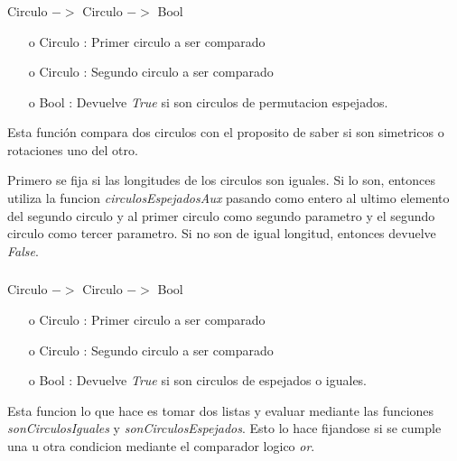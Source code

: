 \documentclass[10pt,journal]{IEEEtran}
\begin{document}
\subsubsection{\color{Red}{sonCirculosEspejados}}
\begin{description}[style=nextline]
        \item[\color{Green}{Signatura}] Circulo $->$ Circulo $->$ Bool
        \begin{itemize} 
        \item [o] Circulo : Primer circulo a ser comparado  
        \item [o] Circulo : Segundo circulo a ser comparado
        \item [o] Bool : Devuelve \textit{True} si son circulos de permutacion espejados.
        \end{itemize}        
        
        \item[\color{Green}{Descripción}]  Esta función compara dos circulos con el proposito de saber si son simetricos o rotaciones uno del otro. 
        
        Primero se fija si las longitudes de los circulos son iguales. Si lo son, entonces utiliza la funcion \textit{circulosEspejadosAux} pasando como entero al ultimo elemento del segundo circulo y al primer circulo como segundo parametro y el segundo circulo como tercer parametro. Si no son de igual longitud, entonces devuelve \textit{False}. 
\end{description}


\subsubsection{\color{Red}{sonCirculosIgualesOEspejados}}
\begin{description}[style=nextline]
        \item[\color{Green}{Signatura}] Circulo $->$ Circulo $->$ Bool
        \begin{itemize} 
        \item [o] Circulo : Primer circulo a ser comparado  
        \item [o] Circulo : Segundo circulo a ser comparado
        \item [o] Bool : Devuelve \textit{True} si son circulos de espejados o iguales.
        \end{itemize}              
        \item[\color{Green}{Descripción}] Esta funcion lo que hace es tomar dos listas y evaluar mediante las funciones \textit{sonCirculosIguales} y \textit{sonCirculosEspejados}. Esto lo hace fijandose si se cumple una u otra condicion mediante el comparador logico \textit{or}.   
\end{description}
\end{document}
